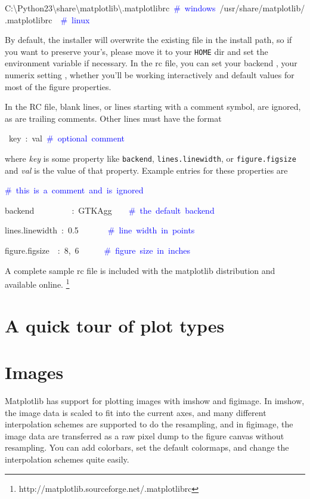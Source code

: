 \begin{lyxcode}
C:\textbackslash{}Python23\textbackslash{}share\textbackslash{}matplotlib\textbackslash{}.matplotlibrc~\textcolor{blue}{\#~windows}~/usr/share/matplotlib/.matplotlibrc~~\textcolor{blue}{\#~linux}
\end{lyxcode}
By default, the installer will overwrite the existing file in the
install path, so if you want to preserve your's, please move it to
your \texttt{HOME} dir and set the environment variable if necessary.
In the rc file, you can set your backend , your numerix setting ,
whether you'll be working interactively and default values for most
of the figure properties. 

In the RC file, blank lines, or lines starting with a comment symbol,
are ignored, as are trailing comments. Other lines must have the format

\begin{lyxcode}
~key~:~val~\textcolor{blue}{\#~optional~comment}~
\end{lyxcode}
where \textit{key} is some property like \texttt{backend}, \texttt{lines.linewidth},
or \texttt{figure.figsize} and \textit{val} is the value of that property.
Example entries for these properties are

\begin{lyxcode}
\textcolor{blue}{\#~this~is~a~comment~and~is~ignored~}

backend~~~~~~~~~:~GTKAgg~~~~\textcolor{blue}{\#~the~default~backend~}

lines.linewidth~:~0.5~~~~~~~\textcolor{blue}{\#~line~width~in~points}~

figure.figsize~~:~8,~6~~~~~~\textcolor{blue}{\#~figure~size~in~inches~}
\end{lyxcode}
A complete sample rc file is included with the matplotlib distribution
and available online.%
\footnote{http://matplotlib.sourceforge.net/.matplotlibrc%
}


\section[Plot Types]{A quick tour of plot types}


\section{Images}

Matplotlib has support for plotting images with imshow and figimage.
In imshow, the image data is scaled to fit into the current axes,
and many different interpolation schemes are supported to do the resampling,
and in figimage, the image data are transferred as a raw pixel dump
to the figure canvas without resampling. You can add colorbars, set
the default colormaps, and change the interpolation schemes quite
easily. 

